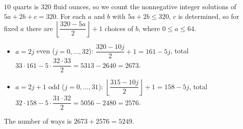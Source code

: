 $10$ quarts is $320$ fluid ounces, so we count the nonnegative integer solutions of $5a+2b+c=320$. For each $a$ and $b$ with $5a+2b\le320$, $c$ is determined, so for fixed $a$ there are $\left\lfloor\dfrac{320-5a}{2}\right\rfloor+1$ choices of $b$, where $0\le a\le64$.
\begin{itemize}
\item $a=2j$ even ($j=0,\dots,32$): $\dfrac{320-10j}{2}+1=161-5j$, total $33\cdot161-5\cdot\dfrac{32\cdot33}{2}=5313-2640=2673$.
\item $a=2j+1$ odd ($j=0,\dots,31$): $\left\lfloor\dfrac{315-10j}{2}\right\rfloor+1=158-5j$, total $32\cdot158-5\cdot\dfrac{31\cdot32}{2}=5056-2480=2576$.
\end{itemize}
The number of ways is $2673+2576=\boxed{5249}$.
